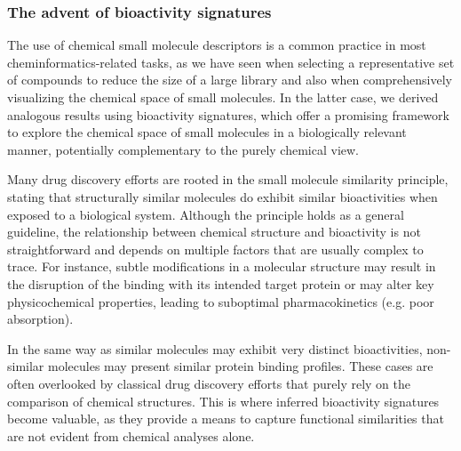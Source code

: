 \subsubsection{The advent of bioactivity signatures}

The use of chemical small molecule descriptors is a common practice in most cheminformatics-related tasks, as we have seen when selecting a representative set of compounds to reduce the size of a large library and also when comprehensively visualizing the chemical space of small molecules. In the latter case, we derived analogous results using bioactivity signatures, which offer a promising framework to explore the chemical space of small molecules in a biologically relevant manner, potentially complementary to the purely chemical view. 

Many drug discovery efforts are rooted in the small molecule similarity principle, stating that structurally similar molecules do exhibit similar bioactivities when exposed to a biological system. Although the principle holds as a general guideline, the relationship between chemical structure and bioactivity is not straightforward and depends on multiple factors that are usually complex to trace. For instance, subtle modifications in a molecular structure may result in the disruption of the binding with its intended target protein or may alter key physicochemical properties, leading to suboptimal pharmacokinetics (e.g. poor absorption).

In the same way as similar molecules may exhibit very distinct bioactivities, non-similar molecules may present similar protein binding profiles. These cases are often overlooked by classical drug discovery efforts that purely rely on the comparison of chemical structures. This is where inferred bioactivity signatures become valuable, as they provide a means to capture functional similarities that are not evident from chemical analyses alone.

